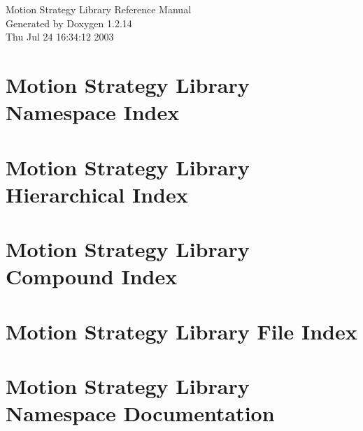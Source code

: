 \documentclass[letterpaper]{book}
\begin{document}
\begin{titlepage}
\vspace*{7cm}
\begin{center}
{\Large Motion Strategy Library Reference Manual}\\
\vspace*{1cm}
{\large Generated by Doxygen 1.2.14}\\
\vspace*{0.5cm}
{\small Thu Jul 24 16:34:12 2003}\\
\end{center}
\end{titlepage}
\clearemptydoublepage
{}
\tableofcontents
\clearemptydoublepage
{}
\chapter{Motion Strategy Library Namespace Index}

\chapter{Motion Strategy Library Hierarchical Index}

\chapter{Motion Strategy Library Compound Index}

\chapter{Motion Strategy Library File Index}

\chapter{Motion Strategy Library Namespace Documentation}

\end{document}
